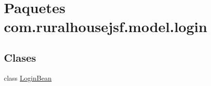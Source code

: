 \hypertarget{namespacecom_1_1ruralhousejsf_1_1model_1_1login}{}\section{Paquetes com.\+ruralhousejsf.\+model.\+login}
\label{namespacecom_1_1ruralhousejsf_1_1model_1_1login}
\subsection*{Clases}
\begin{DoxyCompactItemize}
\item 
class \mbox{\hyperlink{classcom_1_1ruralhousejsf_1_1model_1_1login_1_1_login_bean}{Login\+Bean}}
\end{DoxyCompactItemize}
